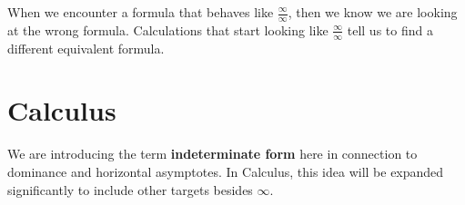 \documentclass{ximera}
\begin{document}
When we encounter a formula that behaves like $\frac{\infty}{\infty}$, then we know we are looking at the wrong formula.   Calculations that start looking like $\frac{\infty}{\infty}$ tell us to find a different equivalent formula. \\



























\section*{Calculus}


We are introducing the term \textbf{indeterminate form} here in connection to dominance and horizontal asymptotes.  In Calculus, this idea will be expanded significantly to include other targets besides $\infty$.
\end{document}
